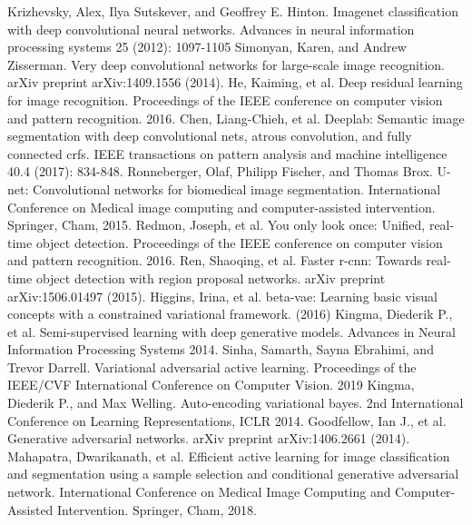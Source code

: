 \documentclass[runningheads]{llncs}
\begin{document}
\begin{thebibliography}{8}
    Krizhevsky, Alex, Ilya Sutskever, and Geoffrey E. Hinton. Imagenet classification with deep convolutional neural networks. Advances in neural information processing systems 25 (2012): 1097-1105
    Simonyan, Karen, and Andrew Zisserman. Very deep convolutional networks for large-scale image recognition. arXiv preprint arXiv:1409.1556 (2014).
    He, Kaiming, et al. Deep residual learning for image recognition. Proceedings of the IEEE conference on computer vision and pattern recognition. 2016.
    Chen, Liang-Chieh, et al. Deeplab: Semantic image segmentation with deep convolutional nets, atrous convolution, and fully connected crfs. IEEE transactions on pattern analysis and machine intelligence 40.4 (2017): 834-848.
    Ronneberger, Olaf, Philipp Fischer, and Thomas Brox. U-net: Convolutional networks for biomedical image segmentation. International Conference on Medical image computing and computer-assisted intervention. Springer, Cham, 2015.
    Redmon, Joseph, et al. You only look once: Unified, real-time object detection. Proceedings of the IEEE conference on computer vision and pattern recognition. 2016.
    Ren, Shaoqing, et al. Faster r-cnn: Towards real-time object detection with region proposal networks. arXiv preprint arXiv:1506.01497 (2015).
    Higgins, Irina, et al. beta-vae: Learning basic visual concepts with a constrained variational framework. (2016)
    Kingma, Diederik P., et al. Semi-supervised learning with deep generative models. Advances in Neural Information Processing Systems 2014.
    Sinha, Samarth, Sayna Ebrahimi, and Trevor Darrell. Variational adversarial active learning. Proceedings of the IEEE/CVF International Conference on Computer Vision. 2019
    Kingma, Diederik P., and Max Welling. Auto-encoding variational bayes. 2nd International Conference on Learning Representations, {ICLR} 2014.
    Goodfellow, Ian J., et al. Generative adversarial networks. arXiv preprint arXiv:1406.2661 (2014).
    Mahapatra, Dwarikanath, et al. Efficient active learning for image classification and segmentation using a sample selection and conditional generative adversarial network. International Conference on Medical Image Computing and Computer-Assisted Intervention. Springer, Cham, 2018.

\end{thebibliography}
\end{document}
